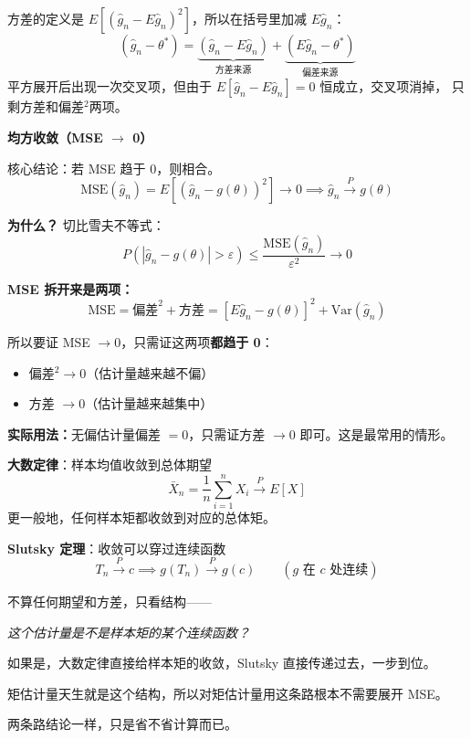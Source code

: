 \begin{dxtips}
    方差的定义是 $E[(\hat{g}_n - E\hat{g}_n)^2]$，所以在括号里加减 $E\hat{g}_n$：
$$(\hat{g}_n - \theta^*) = \underbrace{(\hat{g}_n - E\hat{g}_n)}_{\text{方差来源}} + \underbrace{(E\hat{g}_n - \theta^*)}_{\text{偏差来源}}$$
平方展开后出现一次交叉项，但由于 $E[\hat{g}_n - E\hat{g}_n] = 0$ 恒成立，交叉项消掉，
只剩方差和偏差$^2$两项。
\end{dxtips}
\begin{note}
    \textbf{均方收敛（MSE $\to$ 0）}

核心结论：若 MSE 趋于 0，则相合。
$$\mathrm{MSE}(\hat{g}_n) = E[(\hat{g}_n - g(\theta))^2] \to 0 \implies \hat{g}_n \xrightarrow{P} g(\theta)$$

\textbf{为什么？} 切比雪夫不等式：
$$P(|\hat{g}_n - g(\theta)| > \varepsilon) \leq \frac{\mathrm{MSE}(\hat{g}_n)}{\varepsilon^2} \to 0$$

\textbf{MSE 拆开来是两项：}
$$\mathrm{MSE} = \text{偏差}^2 + \text{方差} = [E\hat{g}_n - g(\theta)]^2 + \mathrm{Var}(\hat{g}_n)$$

所以要证 MSE $\to 0$，只需证这两项\textbf{都趋于 0}：
\begin{itemize}
    \item 偏差$^2 \to 0$（估计量越来越不偏）
    \item 方差 $\to 0$（估计量越来越集中）
\end{itemize}

\textbf{实际用法：}无偏估计量偏差 $= 0$，只需证方差 $\to 0$ 即可。这是最常用的情形。
\end{note}
\begin{note}
    \textbf{大数定律}：样本均值收敛到总体期望
$$\bar{X}_n = \frac{1}{n}\sum_{i=1}^n X_i \xrightarrow{P} E[X]$$
更一般地，任何样本矩都收敛到对应的总体矩。

\textbf{Slutsky 定理}：收敛可以穿过连续函数
$$T_n \xrightarrow{P} c \implies g(T_n) \xrightarrow{P} g(c) \qquad (g \text{ 在 } c \text{ 处连续})$$
\end{note}
\begin{note}
不算任何期望和方差，只看结构——
\begin{center}
\textit{这个估计量是不是样本矩的某个连续函数？}
\end{center}
如果是，大数定律直接给样本矩的收敛，Slutsky 直接传递过去，一步到位。

矩估计量天生就是这个结构，所以对矩估计量用这条路根本不需要展开 MSE。

两条路结论一样，只是省不省计算而已。
\end{note}

